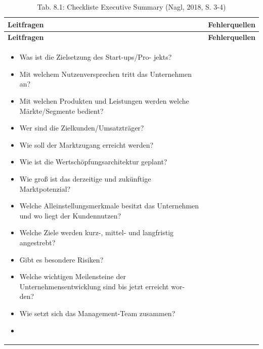 \documentclass[
  letterpaper,
]{book}
\begin{document}
\begin{longtable}[]{@{}
  >{\raggedright\arraybackslash}p{}
  >{\raggedright\arraybackslash}p{}@{}}
\caption{Tab. 8.1: Checkliste Executive Summary (Nagl, 2018, S.
3-4)}\tabularnewline
\toprule\noalign{}
\begin{minipage}[b]{\linewidth}\raggedright
\textbf{Leitfragen}
\end{minipage} & \begin{minipage}[b]{\linewidth}\raggedright
\textbf{Fehlerquellen}
\end{minipage} \\
\midrule\noalign{}
\endfirsthead
\toprule\noalign{}
\begin{minipage}[b]{\linewidth}\raggedright
\textbf{Leitfragen}
\end{minipage} & \begin{minipage}[b]{\linewidth}\raggedright
\textbf{Fehlerquellen}
\end{minipage} \\
\midrule\noalign{}
\endhead
\bottomrule\noalign{}
\endlastfoot
\begin{minipage}[t]{\linewidth}\raggedright
\begin{itemize}
\item
  Was ist die Zielsetzung des Start-ups/Pro- jekts?
\item
  Mit welchem Nutzenversprechen tritt das Unternehmen an?
\item
  Mit welchen Produkten und Leistungen werden welche Märkte/Segmente
  bedient?
\item
  Wer sind die Zielkunden/Umsatzträger?
\item
  Wie soll der Marktzugang erreicht werden?
\item
  Wie ist die Wertschöpfungsarchitektur geplant?
\item
  Wie groß ist das derzeitige und zukünftige Marktpotenzial?
\item
  Welche Alleinstellungsmerkmale besitzt das Unternehmen und wo liegt
  der Kundennutzen?
\item
  Welche Ziele werden kurz-, mittel- und langfristig angestrebt?
\item
  Gibt es besondere Risiken?
\item
  Welche wichtigen Meilensteine der Unternehmensentwicklung sind bis
  jetzt erreicht wor- den?
\item
  Wie setzt sich das Management-Team zusammen?
\item

\end{itemize}
\end{minipage}
\end{longtable}
\end{document}
